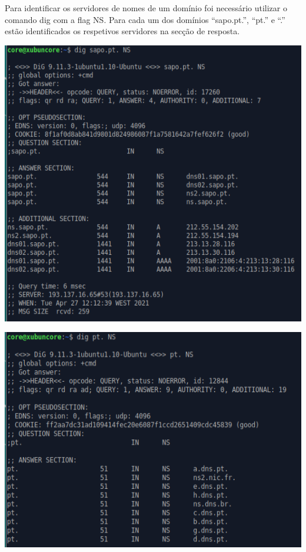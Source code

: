 \documentclass[a4paper]{article}
\begin{document}
Para identificar os servidores de nomes de um domínio foi necessário utilizar o comando dig com a flag NS. Para cada um dos domínios “sapo.pt.”, “pt.” e “.” estão identificados os respetivos servidores na secção de resposta.

\begin{center}
	\includegraphics[scale=0.6]{images/1cSapo}
\end{center}

\begin{center}
	\includegraphics[scale=0.6]{images/1cPt}
\end{center}
\end{document}
